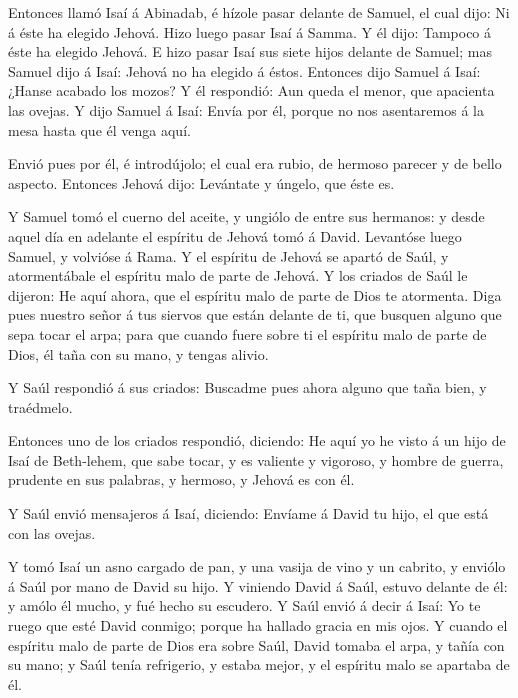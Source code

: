  Entonces llamó Isaí á Abinadab, é hízole pasar delante de
Samuel, el cual dijo: Ni á éste ha elegido Jehová.  Hizo
luego pasar Isaí á Samma. Y él dijo: Tampoco á éste ha elegido Jehová.
 E hizo pasar Isaí sus siete hijos delante de Samuel; mas
Samuel dijo á Isaí: Jehová no ha elegido á éstos.  Entonces
dijo Samuel á Isaí: ¿Hanse acabado los mozos? Y él respondió: Aun queda
el menor, que apacienta las ovejas. Y dijo Samuel á Isaí: Envía por él,
porque no nos asentaremos á la mesa hasta que él venga aquí.

 Envió pues por él, é introdújolo; el cual era rubio, de
hermoso parecer y de bello aspecto. Entonces Jehová dijo: Levántate y
úngelo, que éste es.

 Y Samuel tomó el cuerno del aceite, y ungiólo de entre sus
hermanos: y desde aquel día en adelante el espíritu de Jehová tomó á
David. Levantóse luego Samuel, y volvióse á Rama.  Y el
espíritu de Jehová se apartó de Saúl, y atormentábale el espíritu malo
de parte de Jehová.  Y los criados de Saúl le dijeron: He
aquí ahora, que el espíritu malo de parte de Dios te atormenta.
 Diga pues nuestro señor á tus siervos que están delante de
ti, que busquen alguno que sepa tocar el arpa; para que cuando fuere
sobre ti el espíritu malo de parte de Dios, él taña con su mano, y
tengas alivio.

 Y Saúl respondió á sus criados: Buscadme pues ahora alguno
que taña bien, y traédmelo.

 Entonces uno de los criados respondió, diciendo: He aquí
yo he visto á un hijo de Isaí de Beth-lehem, que sabe tocar, y es
valiente y vigoroso, y hombre de guerra, prudente en sus palabras, y
hermoso, y Jehová es con él.

 Y Saúl envió mensajeros á Isaí, diciendo: Envíame á David
tu hijo, el que está con las ovejas.

 Y tomó Isaí un asno cargado de pan, y una vasija de vino y
un cabrito, y enviólo á Saúl por mano de David su hijo.  Y
viniendo David á Saúl, estuvo delante de él: y amólo él mucho, y fué
hecho su escudero.  Y Saúl envió á decir á Isaí: Yo te
ruego que esté David conmigo; porque ha hallado gracia en mis ojos.
 Y cuando el espíritu malo de parte de Dios era sobre Saúl,
David tomaba el arpa, y tañía con su mano; y Saúl tenía refrigerio, y
estaba mejor, y el espíritu malo se apartaba de él.

